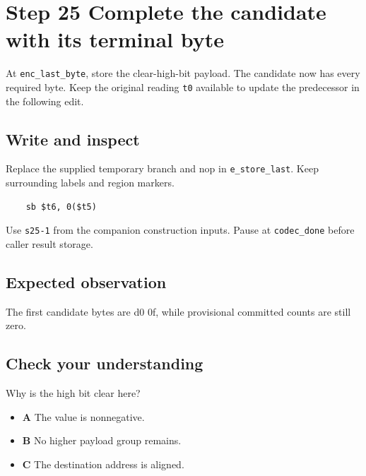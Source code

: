 \section{Step 25 Complete the candidate with its terminal byte}\label{delta-s25}

At \texttt{enc\_last\_byte}, store the clear-high-bit payload. The candidate now has every required byte. Keep the original reading \texttt{t0} available to update the predecessor in the following edit.

\subsection{Write and inspect}
Replace the supplied temporary branch and nop in \texttt{e\_store\_last}. Keep surrounding labels and region markers.

\begin{verbatim}
    sb $t6, 0($t5)
\end{verbatim}
Use \texttt{s25-1} from the companion construction inputs. Pause at \texttt{codec\_done} before caller result storage.

\subsection{Expected observation}
The first candidate bytes are d0 0f, while provisional committed counts are still zero.

\subsection{Check your understanding}
Why is the high bit clear here?

\begin{itemize}
  \item \textbf{A} The value is nonnegative.
  \item \textbf{B} No higher payload group remains.
  \item \textbf{C} The destination address is aligned.
\end{itemize}
